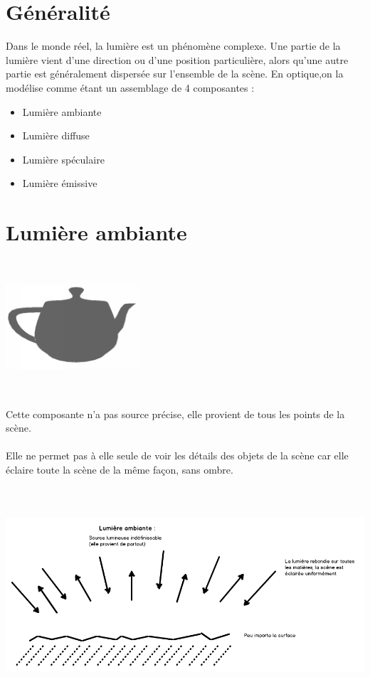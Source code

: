 \section{Généralité}
Dans le monde réel, la lumière est un phénomène complexe.
Une partie de la lumière vient d’une direction ou d’une position particulière, alors
qu’une autre partie est généralement dispersée sur l’ensemble de la scène. En optique,on la modélise comme étant un assemblage de 4 composantes :
\begin{itemize}
\item Lumière ambiante
\item Lumière diffuse
\item Lumière spéculaire
\item Lumière émissive
\end{itemize}

\section{Lumière ambiante}
\begin{center}
\includegraphics[width=5cm,height=5cm]{pipeline/images/objet_ambiante.png}
\end{center}
Cette composante n'a pas source précise, elle provient de tous les points de la scène.
\\\\
Elle ne permet pas à elle seule de voir les détails des objets de la scène car elle éclaire toute la scène de la même façon, sans ombre.
\\\\
\begin{center}
\includegraphics[width=17cm,height=7cm]{pipeline/images/lumiere_ambiante.png}
\end{center}

